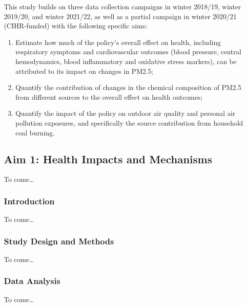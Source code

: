 \documentclass[
  letterpaper,
  DIV=11,
  numbers=noendperiod]{scrartcl}
\begin{document}
This study builds on three data collection campaigns in winter 2018/19,
winter 2019/20, and winter 2021/22, as well as a partial campaign in
winter 2020/21 (CIHR-funded) with the following specific aims:

\begin{enumerate}
\def\labelenumi{\arabic{enumi}.}
\item
  Estimate how much of the policy's overall effect on health, including
  respiratory symptoms and cardiovascular outcomes (blood pressure,
  central hemodynamics, blood inflammatory and oxidative stress
  markers), can be attributed to its impact on changes in PM2.5;
\item
  Quantify the contribution of changes in the chemical composition of
  PM2.5 from different sources to the overall effect on health outcomes;
\item
  Quantify the impact of the policy on outdoor air quality and personal
  air pollution exposures, and specifically the source contribution from
  household coal burning.
\end{enumerate}

\hypertarget{aim-1-health-impacts-and-mechanisms}{%
\subsection{Aim 1: Health Impacts and
Mechanisms}\label{aim-1-health-impacts-and-mechanisms}}

To come\ldots{}

\hypertarget{introduction-1}{%
\subsubsection{Introduction}\label{introduction-1}}

To come\ldots{}

\hypertarget{study-design-and-methods}{%
\subsubsection{Study Design and
Methods}\label{study-design-and-methods}}

To come\ldots{}

\hypertarget{data-analysis}{%
\subsubsection{Data Analysis}\label{data-analysis}}

To come\ldots{}
\end{document}
